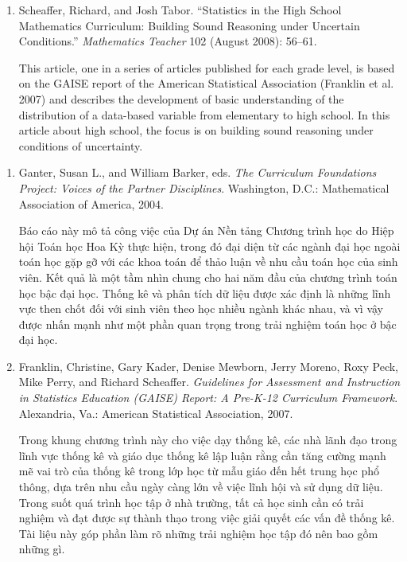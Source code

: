 \documentclass[
  10pt,
  a4paper,
  landscape,
  twoside,
  openany
]{scrbook}
\newcommand{\VI}[1]{#1}
\begin{document}
{{\begin{enumerate}
    \item Scheaffer, Richard, and Josh Tabor. ``Statistics in the High School Mathematics Curriculum: Building Sound Reasoning under Uncertain Conditions.'' \emph{Mathematics Teacher} 102 (August 2008): 56--61.

      This article, one in a series of articles published for each grade level, is based on the GAISE report of the American Statistical Association (Franklin et al. 2007) and describes the development of basic understanding of the distribution of a data-based variable from elementary to high school. In this article about high school, the focus is on building sound reasoning under conditions of uncertainty.
  \end{enumerate}}
}
{
\VI{
  \begin{enumerate}
    \item Ganter, Susan L., and William Barker, eds. \emph{The Curriculum Foundations Project: Voices of the Partner Disciplines}. Washington, D.C.: Mathematical Association of America, 2004.

      Báo cáo này mô tả công việc của Dự án Nền tảng Chương trình học do Hiệp hội Toán học Hoa Kỳ thực hiện, trong đó đại diện từ các ngành đại học ngoài toán học gặp gỡ với các khoa toán để thảo luận về nhu cầu toán học của sinh viên. Kết quả là một tầm nhìn chung cho hai năm đầu của chương trình toán học bậc đại học. Thống kê và phân tích dữ liệu được xác định là những lĩnh vực then chốt đối với sinh viên theo học nhiều ngành khác nhau, và vì vậy được nhấn mạnh như một phần quan trọng trong trải nghiệm toán học ở bậc đại học.
    
    \item Franklin, Christine, Gary Kader, Denise Mewborn, Jerry Moreno, Roxy Peck, Mike Perry, and Richard Scheaffer. \emph{Guidelines for Assessment and Instruction in Statistics Education (GAISE) Report: A Pre-K-12 Curriculum Framework}. Alexandria, Va.: American Statistical Association, 2007.

      Trong khung chương trình này cho việc dạy thống kê, các nhà lãnh đạo trong lĩnh vực thống kê và giáo dục thống kê lập luận rằng cần tăng cường mạnh mẽ vai trò của thống kê trong lớp học từ mẫu giáo đến hết trung học phổ thông, dựa trên nhu cầu ngày càng lớn về việc lĩnh hội và sử dụng dữ liệu. Trong suốt quá trình học tập ở nhà trường, tất cả học sinh cần có trải nghiệm và đạt được sự thành thạo trong việc giải quyết các vấn đề thống kê. Tài liệu này góp phần làm rõ những trải nghiệm học tập đó nên bao gồm những gì.
    

\end{enumerate}}}
\end{document}
